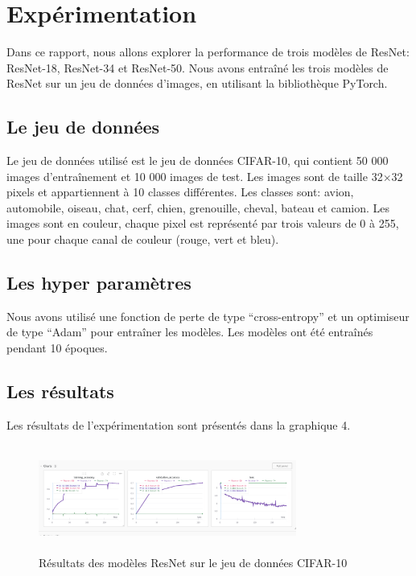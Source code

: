 \documentclass{article}
\begin{document}
\section{Expérimentation}

Dans ce rapport, nous allons explorer la performance de trois modèles de ResNet: ResNet-18, ResNet-34 et ResNet-50.
Nous avons entraîné les trois modèles de ResNet sur un jeu de données d'images, en utilisant la bibliothèque PyTorch.

\subsection{Le jeu de données}

Le jeu de données utilisé est le jeu de données CIFAR-10, qui contient 50 000 images d'entraînement et 10 000 images
de test. Les images sont de taille 32$\times$32 pixels et appartiennent à 10 classes différentes. Les classes sont:
avion, automobile, oiseau, chat, cerf, chien, grenouille, cheval, bateau et camion. Les images sont en couleur,
chaque pixel est représenté par trois valeurs de 0 à 255, une pour chaque canal de couleur (rouge, vert et bleu).

\subsection{Les hyper paramètres}

Nous avons utilisé une fonction de perte de type ``cross-entropy'' et un optimiseur de type ``Adam'' pour entraîner les modèles.
Les modèles ont été entraînés pendant 10 époques.

\subsection{Les résultats}

Les résultats de l'expérimentation sont présentés dans la graphique 4.

\begin{figure}[h]
    \centering
    \includegraphics[width=240pt,height=100pt]{./img/result}
    \caption{Résultats des modèles ResNet sur le jeu de données CIFAR-10}\label{fig:result}
\end{figure}
\end{document}
